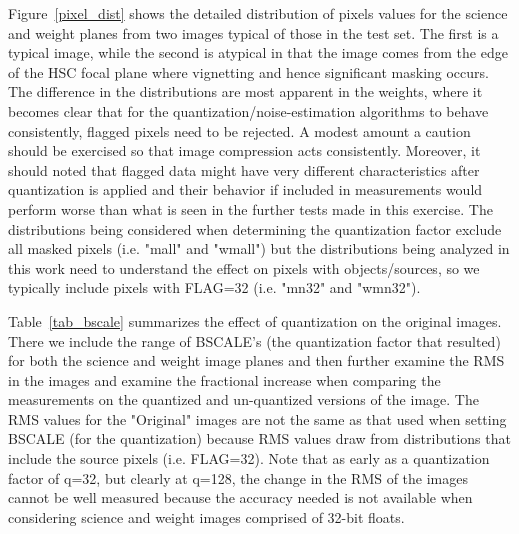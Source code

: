 Figure~\ref{pixel_dist} shows the detailed distribution of pixels values for the science and weight planes 
from two images typical of those in the test set.  The first is a typical image, while the second is atypical
in that the image comes from the edge of the HSC focal plane where vignetting and hence significant masking 
occurs.  The difference in the distributions are most apparent in the weights, where it becomes clear that
for the quantization/noise-estimation algorithms to behave consistently, flagged pixels need to be rejected.
A modest amount a caution should be exercised so that image compression acts consistently.  Moreover, it should
noted that flagged data might have very different characteristics after quantization is applied
and their behavior if included in measurements would perform worse than what is seen in the further tests
made in this exercise.  The distributions being considered when determining the quantization factor exclude
all masked pixels (i.e. "mall" and "wmall") but the distributions being analyzed in this work need to understand
the effect on pixels with objects/sources, so we typically include pixels with FLAG=32 (i.e. "mn32" and "wmn32").

Table~\ref{tab_bscale} summarizes the effect of quantization on the original images.  There we include 
the range of BSCALE's (the quantization factor that resulted) for both the science and weight image planes
and then further examine the RMS in the images and examine the fractional increase when comparing the 
measurements on the quantized and un-quantized versions of the image.  The RMS values for the "Original"
images are not the same as that used when setting BSCALE (for the quantization) because RMS values
draw from distributions that include the source pixels (i.e. FLAG=32).  Note that as early as a quantization
factor of q=32, but clearly at q=128, the change in the RMS of the images cannot be well measured 
because the accuracy needed is not available when considering science and weight images comprised 
of 32-bit floats.

